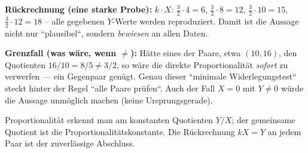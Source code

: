 \begin{kontrolle}
\textbf{Rückrechnung (eine starke Probe):} $k\cdot X$: $\tfrac32\cdot4=6$,
$\tfrac32\cdot8=12$, $\tfrac32\cdot10=15$, $\tfrac32\cdot12=18$ -- alle
gegebenen $Y$-Werte werden reproduziert. Damit ist die Aussage nicht nur
``plausibel``, sondern \emph{bewiesen} an allen Daten.

\textbf{Grenzfall (was wäre, wenn $\neq$):} Hätte eines der Paare, etwa
$(10,16)$, den Quotienten $16/10=8/5\neq3/2$, so wäre die direkte
Proportionalität \emph{sofort} zu verwerfen --- ein Gegenpaar genügt.
Genau dieser ``minimale Widerlegungstest`` steckt hinter der Regel ``alle
Paare prüfen``. Auch der Fall $X=0$ mit $Y\neq0$ würde die Aussage
unmöglich machen (keine Ursprungsgerade).
\end{kontrolle}

\begin{merksatz}
Proportionalität erkennt man am konstanten Quotienten $Y/X$;
der gemeinsame Quotient ist die Proportionalitätskonstante. Die
Rückrechnung $kX=Y$ an jedem Paar ist der zuverlässige Abschluss.
\end{merksatz}
